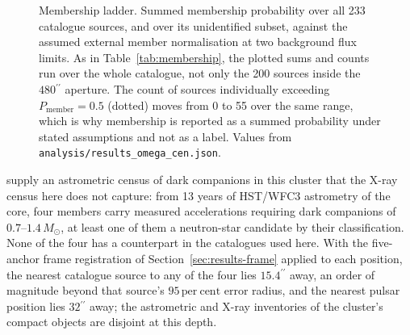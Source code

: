 \documentclass[11pt]{article}
\newcommand{\msun}{\ensuremath{M_\odot}}
\newcommand{\as}{\ensuremath{^{\prime\prime}}}
\begin{document}
\begin{figure}[tbp]
\centering
{}
\caption{Membership ladder. Summed membership probability over all 233 catalogue sources, and over its unidentified subset, against the assumed external member normalisation at two background flux limits. As in Table~\ref{tab:membership}, the plotted sums and counts run over the whole catalogue, not only the 200 sources inside the $480\as$ aperture. The count of sources individually exceeding $P_{\mathrm{member}} = 0.5$ (dotted) moves from 0 to 55 over the same range, which is why membership is reported as a summed probability under stated assumptions and not as a label. Values from \texttt{analysis/results\_omega\_cen.json}.}
\label{fig:membership}
\end{figure}

\citet{Platais2024} supply an astrometric census of dark companions in this cluster that the X-ray census here does not capture: from 13 years of HST/WFC3 astrometry of the core, four members carry measured accelerations requiring dark companions of $0.7$--$1.4\,\msun$, at least one of them a neutron-star candidate by their classification. None of the four has a counterpart in the catalogues used here. With the five-anchor frame registration of Section~\ref{sec:results-frame} applied to each position, the nearest catalogue source to any of the four lies $15.4\as$ away, an order of magnitude beyond that source's $95\,\mathrm{per~cent}$ error radius, and the nearest pulsar position lies $32\as$ away; the astrometric and X-ray inventories of the cluster's compact objects are disjoint at this depth.
\end{document}
